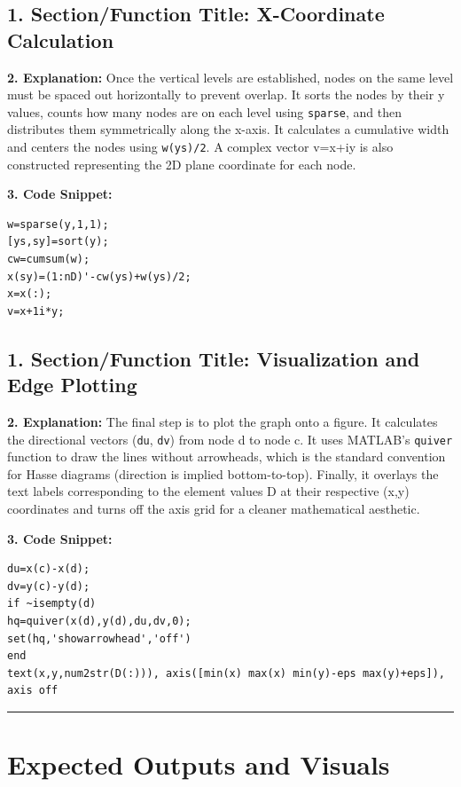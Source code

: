 \vspace{0.5cm}

\subsection*{1. Section/Function Title: X-Coordinate Calculation}
\textbf{2. Explanation:} Once the vertical levels are established, nodes on the same level must be spaced out horizontally to prevent overlap. It sorts the nodes by their y values, counts how many nodes are on each level using \texttt{sparse}, and then distributes them symmetrically along the x-axis. It calculates a cumulative width and centers the nodes using \texttt{w(ys)/2}. A complex vector v=x+iy is also constructed representing the 2D plane coordinate for each node.

\textbf{3. Code Snippet:}
\begin{lstlisting}
w=sparse(y,1,1);
[ys,sy]=sort(y);
cw=cumsum(w);
x(sy)=(1:nD)'-cw(ys)+w(ys)/2;
x=x(:);
v=x+1i*y;
\end{lstlisting}

\vspace{0.5cm}

\subsection*{1. Section/Function Title: Visualization and Edge Plotting}
\textbf{2. Explanation:} The final step is to plot the graph onto a figure. It calculates the directional vectors (\texttt{du}, \texttt{dv}) from node d to node c. It uses MATLAB's \texttt{quiver} function to draw the lines without arrowheads, which is the standard convention for Hasse diagrams (direction is implied bottom-to-top). Finally, it overlays the text labels corresponding to the element values D at their respective (x,y) coordinates and turns off the axis grid for a cleaner mathematical aesthetic.

\textbf{3. Code Snippet:}
\begin{lstlisting}
du=x(c)-x(d);
dv=y(c)-y(d);
if ~isempty(d)
hq=quiver(x(d),y(d),du,dv,0);
set(hq,'showarrowhead','off')
end
text(x,y,num2str(D(:))), axis([min(x) max(x) min(y)-eps max(y)+eps]), axis off
\end{lstlisting}

\vspace{0.5cm}
\hrule
\vspace{0.5cm}

\section{Expected Outputs and Visuals}

